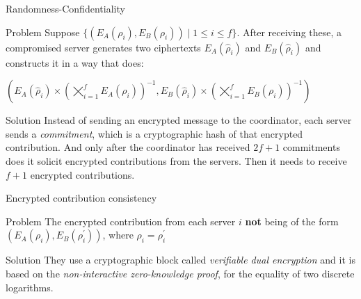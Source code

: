 \documentclass[10pt]{beamer}
\begin{document}
\begin{frame}{Randomness-Confidentiality}
  \begin{alertblock}{Problem}
    Suppose $\{ (E_A(\rho_i), E_B(\rho_i)) \mid 1 \le i \le f \}$. After receiving these, a compromised server generates two ciphertexts $E_A(\hat{\rho}_i)$ and $ E_B(\hat{\rho}_i)$ and constructs it in a way that does:\\
    \begin{center}
    $
      (E_A(\hat{\rho}_i) \times {(\bigtimes_{i=1}^{f}E_A(\rho_i))}^{-1} , E_B(\hat{\rho}_i) \times {(\bigtimes_{i=1}^{f}E_B(\rho_i))}^{-1})
    $
    \end{center}
  \end{alertblock}

  \begin{alertblock}{Solution}
    Instead of sending an encrypted message to the coordinator, each server sends a \emph{commitment}, which is a cryptographic hash of that encrypted contribution. And only after the coordinator has received $2f+1$ commitments does it solicit encrypted contributions from the servers. Then it needs to receive $f+1$ encrypted contributions.
  \end{alertblock}
\end{frame}

\begin{frame}{Encrypted contribution consistency}
  \begin{alertblock}{Problem}
    The encrypted contribution from each server $i$ \textbf{not} being of the form $(E_A(\rho_i), E_B(\rho^{\prime}_i))$, where $\rho_i = \rho^{\prime}_i$
  \end{alertblock}

  \begin{alertblock}{Solution}
    They use a cryptographic block called \emph{verifiable dual encryption} and it is based on the \emph{non-interactive zero-knowledge proof}, for the equality of two discrete logarithms.
  \end{alertblock}
\end{frame}

\end{document}
